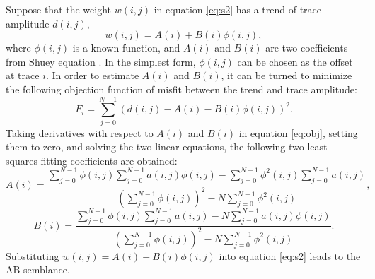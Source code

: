 {}
Suppose that the weight $w(i,j)$ in equation \ref{eq:s2} has a trend of trace amplitude $d(i,j)$, 
\begin{equation}
\label{eq:trend}
w(i,j)=A(i)+B(i)\phi(i,j),
\end{equation}
where $\phi(i,j)$ is a known function, and $A(i)$ and $B(i)$ are two coefficients from Shuey equation \cite[]{Shuey85}. In the simplest form, $\phi(i,j)$ can be chosen as the offset at trace $i$. In order to estimate $A(i)$ and $B(i)$, it can be turned to minimize the following objection function of misfit between the trend and trace amplitude:
\begin{equation}
\label{eq:obj}
F_i=\sum_{j=0}^{N-1}\left(d(i,j)-A(i)-B(i)\phi(i,j)\right)^2.
\end{equation}
Taking derivatives with respect to $A(i)$ and $B(i)$ in equation \ref{eq:obj}, setting them to zero, and solving the two linear equations, the following two least-squares fitting coefficients are obtained:
\begin{equation}
\label{eq:A}
A(i)=\frac{\displaystyle\sum_{j=0}^{N-1}\phi(i,j)\sum_{j=0}^{N-1}a(i,j)\phi(i,j) - \sum_{j=0}^{N-1}\phi^2(i,j)\sum_{j=0}^{N-1}a(i,j)}{\displaystyle\left(\sum_{j=0}^{N-1}\phi(i,j)\right)^2-N\sum_{j=0}^{N-1}\phi^2(i,j)},
\end{equation}
\begin{equation}
\label{eq:B}
B(i)=\frac{\displaystyle\sum_{j=0}^{N-1}\phi(i,j)\sum_{j=0}^{N-1}a(i,j) - N\sum_{j=0}^{N-1}a(i,j)\phi(i,j)}{\displaystyle\left(\sum_{j=0}^{N-1}\phi(i,j)\right)^2-N\sum_{j=0}^{N-1}\phi^2(i,j)}.
\end{equation}
Substituting $w(i,j)=A(i)+B(i)\phi(i,j)$ into equation \ref{eq:s2} leads to the AB semblance. 

